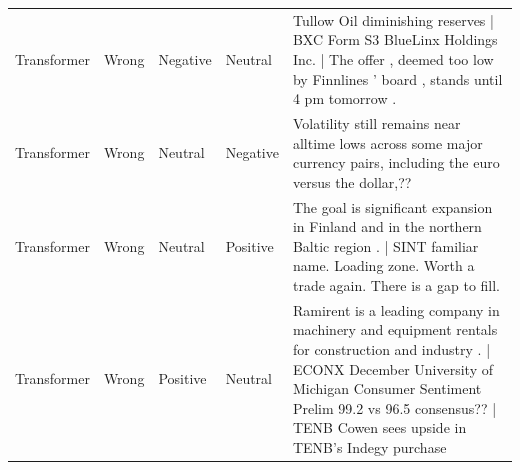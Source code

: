 \begin{longtable}{p{1.8cm}p{1.5cm}p{1.8cm}p{1.8cm}p{16.5cm}}
Transformer & Wrong & Negative & Neutral & Tullow Oil diminishing reserves    |   BXC Form S3 BlueLinx Holdings Inc.    |   The offer , deemed too low by Finnlines ' board , stands until 4 pm tomorrow . \\
Transformer & Wrong & Neutral & Negative & Volatility still remains near alltime lows across some major currency pairs, including the euro versus the dollar,?? \\
Transformer & Wrong & Neutral & Positive & The goal is significant expansion in Finland and in the northern Baltic region .    |   SINT familiar name. Loading zone. Worth a trade again. There is a gap to fill. \\
Transformer & Wrong & Positive & Neutral & Ramirent is a leading company in machinery and equipment rentals for construction and industry .    |   ECONX December University of Michigan Consumer Sentiment Prelim 99.2 vs 96.5 consensus??    |   TENB Cowen sees upside in TENB's Indegy purchase \\
\end{longtable}